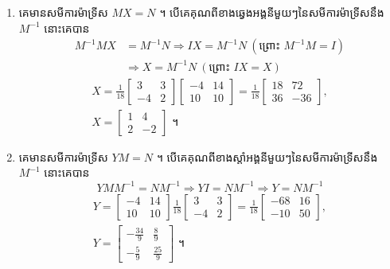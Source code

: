 \begin{enumerate}[a]
  $|P| = \begin{vmatrix} -2 & 3\\ -4 & 6 \end{vmatrix} = -12 + 12 = 0$, $P$ គ្មានម៉ាទ្រីសច្រាសទេ ។
  \item គេមានសមីការម៉ាទ្រីស $MX = N$ ។ បើគេគុណពីខាងឆ្វេងអង្គនីមួយៗនៃសមីការម៉ាទ្រីសនឹង $M^{-1}$ នោះគេបាន
  \[
\begin{aligned}
M^{-1}MX &= M^{-1}N \Rightarrow IX = M^{-1}N \ (\text{ព្រោះ } M^{-1}M = I)\\
&\Rightarrow X = M^{-1}N \ (\text{ព្រោះ } IX = X)
\end{aligned}
\]
  \[
\begin{gathered}
X = \frac{1}{18}\begin{bmatrix} 3 & 3\\ -4 & 2 \end{bmatrix}\begin{bmatrix} -4 & 14\\ 10 & 10 \end{bmatrix} = \frac{1}{18}\begin{bmatrix} 18 & 72\\ 36 & -36 \end{bmatrix},\\
X = \begin{bmatrix} 1 & 4\\ 2 & -2 \end{bmatrix} \text{ ។}
\end{gathered}
\]
  \item គេមានសមីការម៉ាទ្រីស $YM = N$ ។ បើគេគុណពីខាងស្តាំអង្គនីមួយៗនៃសមីការម៉ាទ្រីសនឹង $M^{-1}$ នោះគេបាន
  \[ YMM^{-1} = NM^{-1} \Rightarrow YI = NM^{-1} \Rightarrow Y = NM^{-1} \]
  \[
\begin{gathered}
Y = \begin{bmatrix} -4 & 14\\ 10 & 10 \end{bmatrix}\frac{1}{18}\begin{bmatrix} 3 & 3\\ -4 & 2 \end{bmatrix} = \frac{1}{18}\begin{bmatrix} -68 & 16\\ -10 & 50 \end{bmatrix},\\
Y = \begin{bmatrix} -\frac{34}{9} & \frac{8}{9}\\ -\frac{5}{9} & \frac{25}{9} \end{bmatrix} \text{ ។}
\end{gathered}
\]
\end{enumerate}

